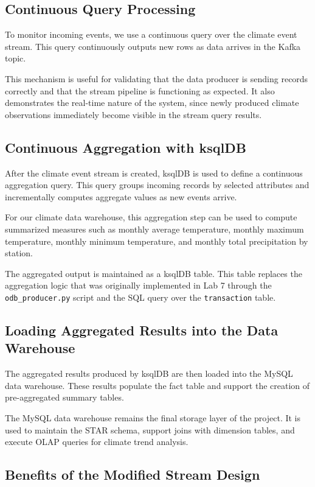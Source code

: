 \documentclass[11pt]{article}
\begin{document}
\subsection{Continuous Query Processing}

To monitor incoming events, we use a continuous query over the climate event stream. This query continuously outputs new rows as data arrives in the Kafka topic.

This mechanism is useful for validating that the data producer is sending records correctly and that the stream pipeline is functioning as expected. It also demonstrates the real-time nature of the system, since newly produced climate observations immediately become visible in the stream query results.

\subsection{Continuous Aggregation with ksqlDB}

After the climate event stream is created, ksqlDB is used to define a continuous aggregation query. This query groups incoming records by selected attributes and incrementally computes aggregate values as new events arrive.

For our climate data warehouse, this aggregation step can be used to compute summarized measures such as monthly average temperature, monthly maximum temperature, monthly minimum temperature, and monthly total precipitation by station.

The aggregated output is maintained as a ksqlDB table. This table replaces the aggregation logic that was originally implemented in Lab 7 through the \texttt{odb\_producer.py} script and the SQL query over the \texttt{transaction} table.

\subsection{Loading Aggregated Results into the Data Warehouse}

The aggregated results produced by ksqlDB are then loaded into the MySQL data warehouse. These results populate the fact table and support the creation of pre-aggregated summary tables.

The MySQL data warehouse remains the final storage layer of the project. It is used to maintain the STAR schema, support joins with dimension tables, and execute OLAP queries for climate trend analysis.

\subsection{Benefits of the Modified Stream Design}
\end{document}
